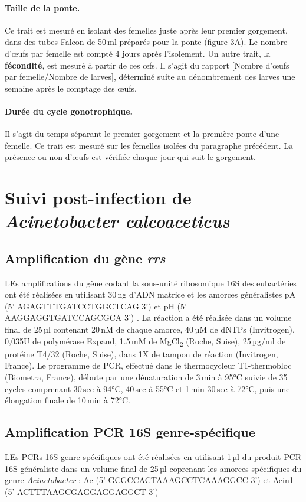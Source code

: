 \paragraph{Taille de la ponte.} Ce trait est mesuré en isolant des femelles juste après leur premier gorgement, dans des tubes Falcon de 50\,ml préparés pour la ponte (figure 3A). Le nombre d'\oe{}ufs par femelle est compté 4 jours après l'isolement.
Un autre trait, la \textbf{fécondité}, est mesuré à partir de ces \oe{}fs. Il s'agit du rapport [Nombre d'\oe{}ufs par femelle/Nombre de larves], déterminé suite au dénombrement des larves une semaine après le comptage des \oe{}ufs.

\paragraph{Durée du cycle gonotrophique.} Il s'agit du temps séparant le premier gorgement et la première ponte d'une femelle. Ce trait est mesuré sur les femelles isolées du paragraphe précédent. La présence ou non d'\oe{}ufs est vérifiée chaque jour qui suit le gorgement.

\section{Suivi post-infection de \textit{Acinetobacter calcoaceticus}}

\subsection{Amplification du gène \textit{rrs}}

LEs amplifications du gène codant la sous-unité ribosomique 16S des eubactéries ont été réalisées en utilisant 30\,ng d'ADN matrice et les amorces généralistes pA (5' AGAGTTTGATCCTGGCTCAG 3') et pH (5' AAGGAGGTGATCCAGCGCA 3') \cite{edwards1989}.
La réaction a été réalisée dans un volume final de 25\,µl contenant 20\,nM de chaque amorce, 40\,µM de dNTPs (Invitrogen), 0,035U de polymérase Expand, 1.5\,mM de MgCl\textsubscript{2} (Roche, Suise), 25\,µg/ml de protéine T4/32 (Roche, Suise), dans 1X de tampon de réaction (Invitrogen, France).
Le programme de PCR, effectué dans le thermocycleur T1-thermobloc (Biometra, France), débute par une dénaturation de 3\,min à 95°C suivie de 35 cycles comprenant 30\,sec à 94°C, 40\,sec à 55°C et 1\,min 30\,sec à 72°C, puis une élongation finale de 10\,min à 72°C.

\subsection{Amplification PCR 16S genre-spécifique}

LEs PCRs 16S genre-spécifiques ont été réalisées en utilisant 1\,µl du produit PCR 16S généraliste dans un volume final de 25\,µl coprenant les amorces spécifiques du genre \textit{Acinetobacter} : Ac (5' GCGCCACTAAAGCCTCAAAGGCC 3') \cite{kenzaka1998} et Acin1 (5' ACTTTAAGCGAGGAGGAGGCT 3') \cite{sanguin2006}
